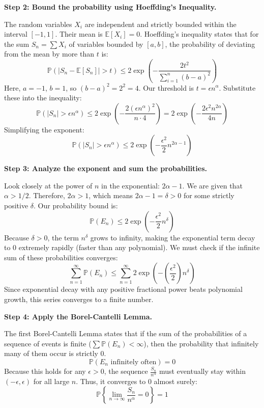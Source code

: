 \begin{solution}
\textbf{Step 2: Bound the probability using Hoeffding's Inequality.}

The random variables $X_i$ are independent and strictly bounded within the interval $[-1, 1]$. Their mean is $\mathbb{E}[X_i] = 0$.
Hoeffding's inequality states that for the sum $S_n = \sum X_i$ of variables bounded by $[a, b]$, the probability of deviating from the mean by more than $t$ is:
\[ \mathbb{P}(|S_n - \mathbb{E}[S_n]| > t) \leq 2 \exp\left( - \frac{2t^2}{\sum_{i=1}^n (b-a)^2} \right) \]
Here, $a = -1$, $b = 1$, so $(b-a)^2 = 2^2 = 4$. Our threshold is $t = \epsilon n^\alpha$.
Substitute these into the inequality:
\[ \mathbb{P}(|S_n| > \epsilon n^\alpha) \leq 2 \exp\left( - \frac{2 (\epsilon n^\alpha)^2}{n \cdot 4} \right) = 2 \exp\left( - \frac{2 \epsilon^2 n^{2\alpha}}{4n} \right) \]
Simplifying the exponent:
\[ \mathbb{P}(|S_n| > \epsilon n^\alpha) \leq 2 \exp\left( - \frac{\epsilon^2}{2} n^{2\alpha - 1} \right) \]

\textbf{Step 3: Analyze the exponent and sum the probabilities.}

Look closely at the power of $n$ in the exponential: $2\alpha - 1$.
We are given that $\alpha > 1/2$. Therefore, $2\alpha > 1$, which means $2\alpha - 1 = \delta > 0$ for some strictly positive $\delta$.
Our probability bound is:
\[ \mathbb{P}(E_n) \leq 2 \exp\left( - \frac{\epsilon^2}{2} n^\delta \right) \]
Because $\delta > 0$, the term $n^\delta$ grows to infinity, making the exponential term decay to 0 extremely rapidly (faster than any polynomial).
We must check if the infinite sum of these probabilities converges:
\[ \sum_{n=1}^\infty \mathbb{P}(E_n) \leq \sum_{n=1}^\infty 2 \exp\left( - \left(\frac{\epsilon^2}{2}\right) n^\delta \right) \]
Since exponential decay with any positive fractional power beats polynomial growth, this series converges to a finite number.

\textbf{Step 4: Apply the Borel-Cantelli Lemma.}

The first Borel-Cantelli Lemma states that if the sum of the probabilities of a sequence of events is finite ($\sum \mathbb{P}(E_n) < \infty$), then the probability that infinitely many of them occur is strictly 0.
\[ \mathbb{P}(E_n \text{ infinitely often}) = 0 \]
Because this holds for any $\epsilon > 0$, the sequence $\frac{S_n}{n^\alpha}$ must eventually stay within $(-\epsilon, \epsilon)$ for all large $n$. Thus, it converges to 0 almost surely:
\[ \mathbb{P}\left\{\lim_{n \to \infty} \frac{S_n}{n^\alpha} = 0\right\} = 1 \]
\end{solution}

